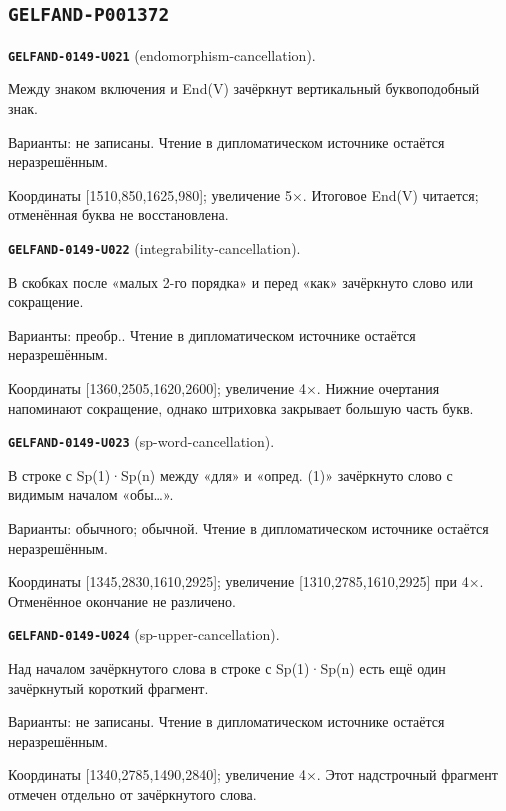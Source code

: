 \documentclass[11pt]{article}
\theoremstyle{definition}
\theoremstyle{remark}
\begin{document}
\subsection*{\texttt{GELFAND-P001372}}
\noindent\leavevmode{}\label{GELFAND-P001372:endomorphism-cancellation:note}\textbf{\texttt{GELFAND-0149-U021}} (endomorphism-cancellation).\par\nopagebreak[4]
Между знаком включения и End(V) зачёркнут вертикальный буквоподобный знак.\par
Варианты: не записаны. Чтение в дипломатическом источнике остаётся неразрешённым.\par
Координаты [1510,850,1625,980]; увеличение 5×. Итоговое End(V) читается; отменённая буква не восстановлена.\par\medskip
\noindent\leavevmode{}\label{GELFAND-P001372:integrability-cancellation:note}\textbf{\texttt{GELFAND-0149-U022}} (integrability-cancellation).\par\nopagebreak[4]
В скобках после «малых 2-го порядка» и перед «как» зачёркнуто слово или сокращение.\par
Варианты: преобр.. Чтение в дипломатическом источнике остаётся неразрешённым.\par
Координаты [1360,2505,1620,2600]; увеличение 4×. Нижние очертания напоминают сокращение, однако штриховка закрывает большую часть букв.\par\medskip
\noindent\leavevmode{}\label{GELFAND-P001372:sp-word-cancellation:note}\textbf{\texttt{GELFAND-0149-U023}} (sp-word-cancellation).\par\nopagebreak[4]
В строке с Sp(1)·Sp(n) между «для» и «опред. (1)» зачёркнуто слово с видимым началом «обы…».\par
Варианты: обычного; обычной. Чтение в дипломатическом источнике остаётся неразрешённым.\par
Координаты [1345,2830,1610,2925]; увеличение [1310,2785,1610,2925] при 4×. Отменённое окончание не различено.\par\medskip
\noindent\leavevmode{}\label{GELFAND-P001372:sp-upper-cancellation:note}\textbf{\texttt{GELFAND-0149-U024}} (sp-upper-cancellation).\par\nopagebreak[4]
Над началом зачёркнутого слова в строке с Sp(1)·Sp(n) есть ещё один зачёркнутый короткий фрагмент.\par
Варианты: не записаны. Чтение в дипломатическом источнике остаётся неразрешённым.\par
Координаты [1340,2785,1490,2840]; увеличение 4×. Этот надстрочный фрагмент отмечен отдельно от зачёркнутого слова.\par\medskip
\end{document}
